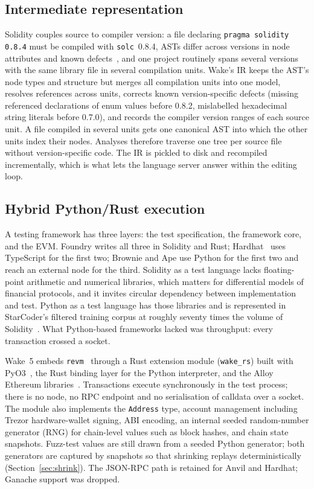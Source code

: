 \documentclass[11pt,a4paper]{article}
\newcommand{\wake}{Wake}
\newcommand{\revm}{\texttt{revm}}
\begin{document}
\subsection{Intermediate representation}
\label{sec:ir}

Solidity couples source to compiler version: a file declaring \texttt{pragma solidity 0.8.4} must be compiled with \texttt{solc}~0.8.4, ASTs differ across versions in node attributes and known defects~\cite{solidity}, and one project routinely spans several versions with the same library file in several compilation units. \wake{}'s IR keeps the AST's node types and structure but merges all compilation units into one model, resolves references across units, corrects known version-specific defects (missing referenced declarations of enum values before 0.8.2, mislabelled hexadecimal string literals before 0.7.0), and records the compiler version ranges of each source unit. A file compiled in several units gets one canonical AST into which the other units index their nodes. Analyses therefore traverse one tree per source file without version-specific code. The IR is pickled to disk and recompiled incrementally, which is what lets the language server answer within the editing loop.

\subsection{Hybrid Python/Rust execution}
\label{sec:hybrid}

A testing framework has three layers: the test specification, the framework core, and the EVM. Foundry writes all three in Solidity and Rust; Hardhat~\cite{hardhat} uses TypeScript for the first two; Brownie and Ape use Python for the first two and reach an external node for the third. Solidity as a test language lacks floating-point arithmetic and numerical libraries, which matters for differential models of financial protocols, and it invites circular dependency between implementation and test. Python as a test language has those libraries and is represented in StarCoder's filtered training corpus at roughly seventy times the volume of Solidity~\cite{li2023starcoder}. What Python-based frameworks lacked was throughput: every transaction crossed a socket.

\wake{}~5 embeds \revm{}~\cite{revm} through a Rust extension module (\texttt{wake\_rs}) built with PyO3~\cite{pyo3}, the Rust binding layer for the Python interpreter, and the Alloy Ethereum libraries~\cite{alloy}. Transactions execute synchronously in the test process; there is no node, no RPC endpoint and no serialisation of calldata over a socket. The module also implements the \texttt{Address} type, account management including Trezor hardware-wallet signing, ABI encoding, an internal seeded random-number generator (RNG) for chain-level values such as block hashes, and chain state snapshots. Fuzz-test values are still drawn from a seeded Python generator; both generators are captured by snapshots so that shrinking replays deterministically (Section~\ref{sec:shrink}). The JSON-RPC path is retained for Anvil and Hardhat; Ganache support was dropped.
\end{document}
